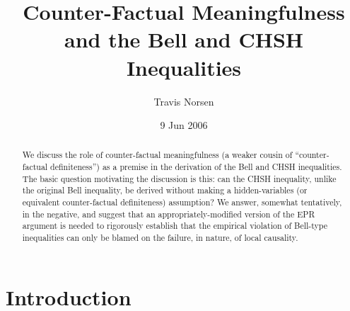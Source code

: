 \documentclass[aps,prc,onecolumn,12pt,nofootinbib]{revtex4-2}
\begin{document}
\title{Counter-Factual Meaningfulness and the Bell and CHSH Inequalities}
\author{Travis Norsen}

\date{9 Jun 2006}

\begin{abstract}
We discuss the role of counter-factual meaningfulness (a weaker
cousin of ``counter-factual definiteness'') as a premise in
the derivation of the Bell and CHSH inequalities.  The basic question
motivating the discussion is this:  can the CHSH inequality, unlike
the original Bell inequality, be derived without making a
hidden-variables (or equivalent counter-factual definiteness)
assumption?  We answer, somewhat tentatively, in the negative, and
suggest that an appropriately-modified version of the EPR argument is
needed to rigorously establish that the empirical violation of
Bell-type inequalities can only be blamed on the failure, in nature,
of local causality.
\end{abstract}

\maketitle


\section{Introduction}
\label{intro}
\end{document}
